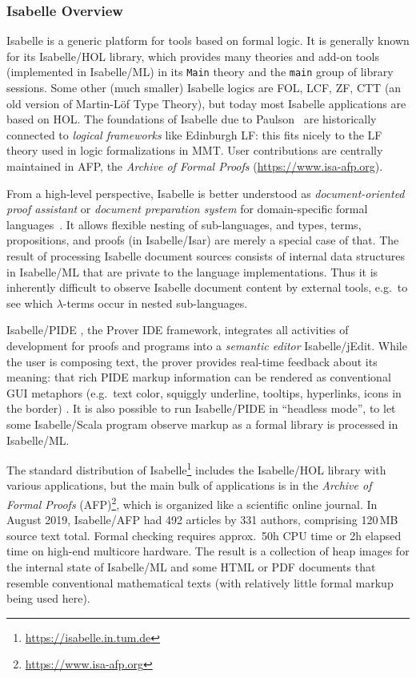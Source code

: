 \subsubsection{Isabelle Overview}

Isabelle is a generic platform for tools based on formal logic.
It is generally known for its Isabelle/HOL library, which provides many theories and add-on tools (implemented in Isabelle/ML) in its \texttt{Main} theory and the \texttt{main} group of library sessions.
Some other (much smaller) Isabelle logics are FOL, LCF, ZF, CTT (an old version of Martin-L\"of Type Theory), but today most Isabelle applications are based on HOL.
The foundations of Isabelle due to Paulson~\cite{paulson700} are historically connected to \emph{logical frameworks} like Edinburgh LF: this fits nicely to the LF theory used in logic formalizations in MMT.
User contributions are centrally maintained in AFP, the \emph{Archive of Formal Proofs} (\url{https://www.isa-afp.org}).

From a high-level perspective, Isabelle is better understood as \emph{document-oriented proof assistant} or \emph{document preparation system} for domain-specific formal languages~\cite{Wenzel:IIdsflitd18}.
It allows flexible nesting of sub-languages, and types, terms, propositions, and proofs (in Isabelle/Isar) are merely a special case of that.
The result of processing Isabelle document sources consists of internal data structures in Isabelle/ML that are private to the language implementations.
Thus it is inherently difficult to observe Isabelle document content by external tools, e.g.\ to see which $\lambda$-terms occur in nested sub-languages.

Isabelle/PIDE \cite{Wenzel:2014:ITP-PIDE}, the Prover IDE framework, integrates all
activities of development for proofs and programs into a
\emph{semantic editor} Isabelle/jEdit. While the user is composing
text, the prover provides real-time feedback about its meaning: that
rich PIDE markup information can be rendered as conventional GUI
metaphors (e.g.\ text color, squiggly underline, tooltips, hyperlinks,
icons in the border) \cite{Wenzel:2019:MKM}. It is also possible to
run Isabelle/PIDE in ``headless mode'', to let some Isabelle/Scala
program observe markup as a formal library is processed in
Isabelle/ML.

The standard distribution of Isabelle\footnote{\url{https://isabelle.in.tum.de}} includes the
Isabelle/HOL library with various applications, but the main bulk of
applications is in the \emph{Archive of Formal Proofs}
(AFP)\footnote{\url{https://www.isa-afp.org}}, which is organized like
a scientific online journal. In August 2019, Isabelle/AFP had 492
articles by 331 authors, comprising 120\,MB source text total. Formal
checking requires approx.\ 50h CPU time or 2h elapsed time on high-end
multicore hardware. The result is a collection of heap images for the
internal state of Isabelle/ML and some HTML or PDF documents that
resemble conventional mathematical texts (with relatively little
formal markup being used here).


